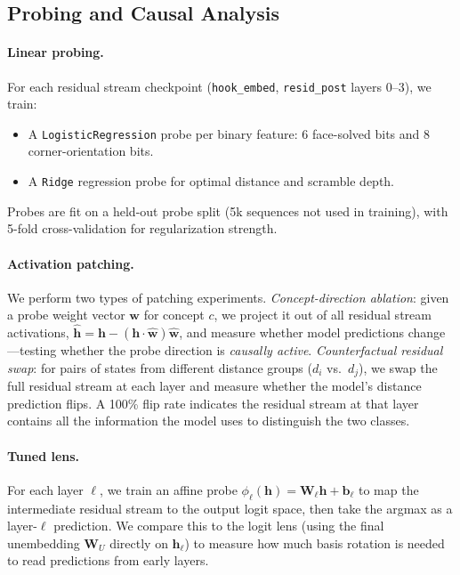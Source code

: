 \documentclass[12pt]{article}
\begin{document}
\subsection{Probing and Causal Analysis}

\paragraph{Linear probing.}

For each residual stream checkpoint
(\texttt{hook\_embed}, \texttt{resid\_post} layers 0--3), we train:
\begin{itemize}
  \item A \texttt{LogisticRegression} probe per binary feature: 6 face-solved
        bits and 8 corner-orientation bits.
  \item A \texttt{Ridge} regression probe for optimal distance and scramble depth.
\end{itemize}
Probes are fit on a held-out probe split (5k sequences not used in training),
with 5-fold cross-validation for regularization strength.

\paragraph{Activation patching.}
\label{sec:patch}

We perform two types of patching experiments.  \emph{Concept-direction ablation}:
given a probe weight vector $\mathbf{w}$ for concept $c$, we project it out of
all residual stream activations,
$\hat{\mathbf{h}} = \mathbf{h} - (\mathbf{h} \cdot \hat{\mathbf{w}})\hat{\mathbf{w}}$,
and measure whether model predictions change---testing whether the probe direction
is \emph{causally active}.  \emph{Counterfactual residual swap}: for pairs of
states from different distance groups ($d_i$ vs.\ $d_j$), we swap the full
residual stream at each layer and measure whether the model's distance prediction
flips.  A 100\% flip rate indicates the residual stream at that layer contains all
the information the model uses to distinguish the two classes.

\paragraph{Tuned lens.}

For each layer $\ell$, we train an affine probe
$\phi_\ell(\mathbf{h}) = \mathbf{W}_\ell \mathbf{h} + \mathbf{b}_\ell$
to map the intermediate residual stream to the output logit space, then take the
argmax as a layer-$\ell$ prediction.  We compare this to the logit lens (using
the final unembedding $\mathbf{W}_U$ directly on $\mathbf{h}_\ell$) to measure
how much basis rotation is needed to read predictions from early layers.
\end{document}
